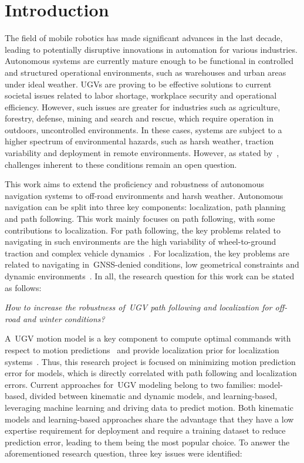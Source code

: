 \documentclass[12pt,letterpaper,oneside]{article}
\begin{document}
\makeCustomTitle
\thispagestyle{titlePage}


\section{Introduction}
\label{sec:introduction}

The field of mobile robotics has made significant advances in the last decade, leading to potentially disruptive innovations in automation for various industries.
Autonomous systems are currently mature enough to be functional in controlled and structured operational environments, such as warehouses and urban areas under ideal weather.
\Acp{UGV} are proving to be effective solutions to current societal issues related to labor shortage, workplace security and operational efficiency. 
However, such issues are greater for industries such as agriculture, forestry, defense, mining and search and rescue,  which require operation in outdoors, uncontrolled environments.
In these cases, systems are subject to a higher spectrum of environmental hazards, such as harsh weather, traction variability and deployment in remote environments.
However, as stated by~\citet{VanBrummelen2018}, challenges inherent to these conditions remain an open question.

This work aims to extend the proficiency and robustness of autonomous navigation systems to off-road environments and harsh weather. 
Autonomous navigation can be split into three key components: localization, path planning and path following. 
This work mainly focuses on path following, with some contributions to localization.
For path following, the key problems related to navigating in such environments are the high variability of wheel-to-ground traction and complex vehicle dynamics~\citep{Baril2020}.
For localization, the key problems are related to navigating in~\ac{GNSS}-denied conditions, low geometrical constraints and dynamic environments~\citep{Baril2022}.
In all, the research question for this work can be stated as follows:

\begin{center}
	\emph{
		How to increase the robustness of~\ac{UGV} path following and localization for off-road and winter conditions?
	}
\end{center}

A~\ac{UGV} motion model is a key component to compute optimal commands with respect to motion predictions~\citep{Brunke2022} and provide localization prior for localization systems~\citep{Dumbgen2023}. 
Thus, this research project is focused on minimizing motion prediction error for models, which is directly correlated with path following and localization errors. 
Current approaches for~\ac{UGV} modeling belong to two families: model-based, divided between kinematic and dynamic models, and learning-based, leveraging machine learning and driving data to predict motion.
Both kinematic models and learning-based approaches share the advantage that they have a low expertise requirement for deployment and require a training dataset to reduce prediction error, leading to them being the most popular choice.
To answer the aforementioned research question, three key issues were identified:
\end{document}
